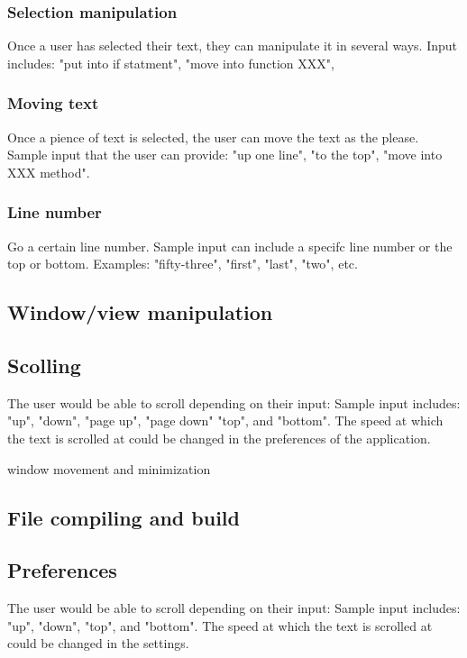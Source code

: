 \documentclass[11pt, oneside]{article}
\begin{document}
	\subsubsection{Selection manipulation}
	Once a user has selected their text, they can manipulate it in several ways. Input includes: "put into if statment", "move into function XXX",  


	\subsubsection{Moving text}
	Once a pience of text is selected, the user can move the text as the please. Sample input that the user can provide: "up one line", "to the top", "move into XXX method".

	\subsubsection{Line number}
	Go a certain line number. Sample input can include a specifc line number or the top or bottom. Examples: "fifty-three", "first", "last", "two", etc.


\subsection{Window/view manipulation}

	\subsection{Scolling}
	The user would be able to scroll depending on their input: Sample input includes: "up", "down", "page up", "page down" "top", and "bottom". The speed at which the text is scrolled at could be changed in the preferences of the application.

	window movement and minimization


\subsection{File compiling and build}

\subsection{Preferences}
The user would be able to scroll depending on their input: Sample input includes: "up", "down", "top", and "bottom". The speed at which the text is scrolled at could be changed in the settings.
\end{document}
